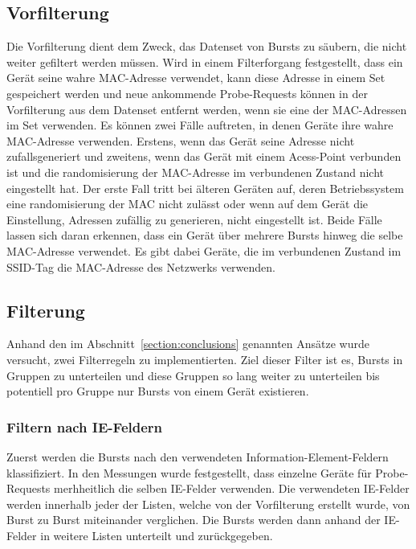 \clearpage

\subsection{Vorfilterung}
Die Vorfilterung dient dem Zweck, das Datenset von Bursts zu säubern, die nicht weiter 
gefiltert werden müssen.
Wird in einem Filterforgang festgestellt, dass ein Gerät seine wahre MAC-Adresse 
verwendet, kann diese Adresse in einem Set gespeichert werden und neue ankommende 
Probe-Requests können in der Vorfilterung aus dem Datenset entfernt werden, wenn 
sie eine der MAC-Adressen im Set verwenden. Es können zwei Fälle auftreten, 
in denen Geräte ihre wahre MAC-Adresse verwenden. Erstens, wenn das Gerät seine 
Adresse nicht zufallsgeneriert und zweitens, wenn das Gerät mit einem Acess-Point 
verbunden ist und die randomisierung der MAC-Adresse im verbundenen Zustand
nicht eingestellt hat. Der erste Fall tritt bei älteren Geräten auf, deren 
Betriebssystem eine randomisierung der MAC nicht zulässt oder wenn auf dem Gerät 
die Einstellung, Adressen zufällig zu generieren, nicht eingestellt ist.
Beide Fälle lassen sich daran erkennen, dass ein Gerät über mehrere Bursts hinweg die 
selbe MAC-Adresse verwendet. Es gibt dabei Geräte, die im verbundenen Zustand im SSID-Tag 
die MAC-Adresse des Netzwerks verwenden.

\subsection{Filterung}
Anhand den im Abschnitt~\ref{section:conclusions} genannten Ansätze wurde versucht, 
zwei Filterregeln zu implementierten.
Ziel dieser Filter ist es, Bursts in Gruppen zu unterteilen und diese Gruppen 
so lang weiter zu unterteilen bis potentiell pro Gruppe nur Bursts von einem Gerät 
existieren. 

\subsubsection*{Filtern nach IE-Feldern}
Zuerst werden die Bursts nach den verwendeten Information-Element-Feldern klassifiziert.
In den Messungen wurde festgestellt, dass einzelne Geräte für Probe-Requests merhheitlich
die selben IE-Felder verwenden. 
Die verwendeten IE-Felder werden innerhalb jeder der Listen, 
welche von der Vorfilterung erstellt wurde, 
von Burst zu Burst miteinander verglichen. 
Die Bursts werden dann anhand der IE-Felder in weitere Listen unterteilt und 
zurückgegeben.


